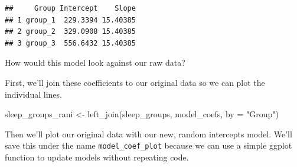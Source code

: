 \documentclass[
]{book}
\newenvironment{Shaded}{\begin{snugshade}}{\end{snugshade}}
\newcommand{\AttributeTok}[1]{\textcolor[rgb]{0.77,0.63,0.00}{#1}}
\newcommand{\CommentTok}[1]{\textcolor[rgb]{0.56,0.35,0.01}{\textit{#1}}}
\newcommand{\FunctionTok}[1]{\textcolor[rgb]{0.00,0.00,0.00}{#1}}
\newcommand{\NormalTok}[1]{#1}
\newcommand{\OtherTok}[1]{\textcolor[rgb]{0.56,0.35,0.01}{#1}}
\newcommand{\SpecialCharTok}[1]{\textcolor[rgb]{0.00,0.00,0.00}{#1}}
\newcommand{\StringTok}[1]{\textcolor[rgb]{0.31,0.60,0.02}{#1}}
\begin{document}
\begin{Shaded}
\end{Shaded}

\begin{verbatim}
##     Group Intercept    Slope
## 1 group_1  229.3394 15.40385
## 2 group_2  329.0908 15.40385
## 3 group_3  556.6432 15.40385
\end{verbatim}

How would this model look against our raw data?

First, we'll join these coefficients to our original data so we can plot the individual lines.

\begin{Shaded}
\begin{Highlighting}[]
\NormalTok{sleep\_groups\_rani }\OtherTok{\textless{}{-}} \FunctionTok{left\_join}\NormalTok{(sleep\_groups, model\_coefs, }\AttributeTok{by =} \StringTok{"Group"}\NormalTok{)}
\end{Highlighting}
\end{Shaded}

Then we'll plot our original data with our new, random intercepts model. We'll save this under the name \texttt{model\_coef\_plot} because we can use a simple ggplot function to update models without repeating code.
\end{document}
